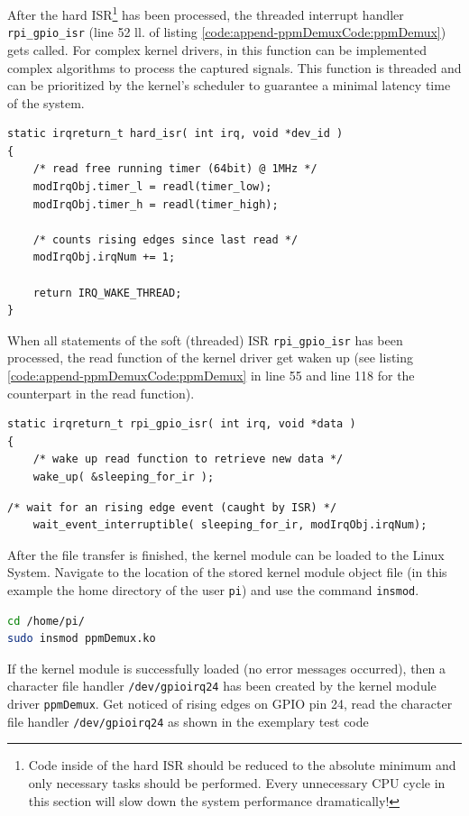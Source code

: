 After the hard ISR\footnote{Code inside of the hard ISR should be reduced to the absolute minimum and only necessary tasks should be performed. Every unnecessary CPU cycle in this section will slow down the system performance dramatically!} has been processed, the threaded interrupt handler \texttt{rpi\_gpio\_isr} (line 52 ll. of listing \ref{code:append-ppmDemuxCode:ppmDemux}) gets called. For complex kernel drivers, in this function can be implemented complex algorithms to process the captured signals. This function is threaded and can be prioritized by the kernel's scheduler to guarantee a minimal latency time of the system.
\begin{lstlisting}[firstnumber=60]
static irqreturn_t hard_isr( int irq, void *dev_id )
{
	/* read free running timer (64bit) @ 1MHz */
	modIrqObj.timer_l = readl(timer_low);
	modIrqObj.timer_h = readl(timer_high);

	/* counts rising edges since last read */
	modIrqObj.irqNum += 1;

	return IRQ_WAKE_THREAD;
}
\end{lstlisting}
When all statements of the soft (threaded) ISR \texttt{rpi\_gpio\_isr} has been processed, the read function of the kernel driver get waken up (see listing \ref{code:append-ppmDemuxCode:ppmDemux} in line 55 and line 118 for the counterpart in the read function).
\begin{lstlisting}[firstnumber=52]
static irqreturn_t rpi_gpio_isr( int irq, void *data )
{
	/* wake up read function to retrieve new data */
	wake_up( &sleeping_for_ir );
\end{lstlisting}
\vspace{-0.7cm}
\begin{lstlisting}[firstnumber=117]
	/* wait for an rising edge event (caught by ISR) */
	wait_event_interruptible( sleeping_for_ir, modIrqObj.irqNum);
\end{lstlisting}


After the file transfer is finished, the kernel module can be loaded to the Linux System. Navigate to the location of the stored kernel module object file (in this example the home directory of the user \texttt{pi}) and use the command \texttt{insmod}.
\begin{lstlisting}[language=bash,otherkeywords={insmod, sudo}]
cd /home/pi/
sudo insmod ppmDemux.ko
\end{lstlisting}

If the kernel module is successfully loaded (no error messages occurred), then a character file handler \texttt{/dev/gpioirq24} has been created by the kernel module driver \texttt{ppmDemux}. Get noticed of rising edges on GPIO pin 24, read the character file handler \texttt{/dev/gpioirq24} as shown in the exemplary test code

